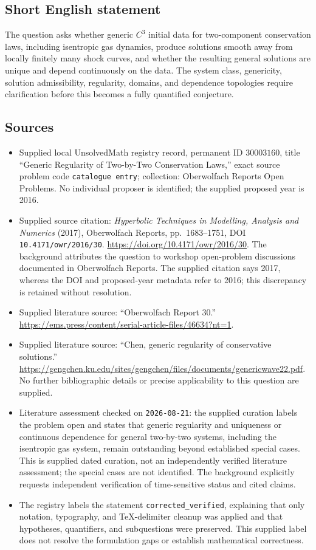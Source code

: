 \documentclass[11pt]{article}
\begin{document}
\subsection{Short English statement}
The question asks whether generic \(C^3\) initial data for two-component conservation laws, including isentropic gas dynamics, produce solutions smooth away from locally finitely many shock curves, and whether the resulting general solutions are unique and depend continuously on the data. The system class, genericity, solution admissibility, regularity, domains, and dependence topologies require clarification before this becomes a fully quantified conjecture.
\subsection{Sources}
\begin{itemize}
\item Supplied local UnsolvedMath registry record, permanent ID \(30003160\), title ``Generic Regularity of Two-by-Two Conservation Laws,'' exact source problem code \texttt{catalogue entry}; collection: Oberwolfach Reports Open Problems. No individual proposer is identified; the supplied proposed year is 2016.
\item Supplied source citation: \emph{Hyperbolic Techniques in Modelling, Analysis and Numerics} (2017), Oberwolfach Reports, pp.\ 1683--1751, DOI \texttt{10.4171/owr/2016/30}. \url{https://doi.org/10.4171/owr/2016/30}. The background attributes the question to workshop open-problem discussions documented in Oberwolfach Reports. The supplied citation says 2017, whereas the DOI and proposed-year metadata refer to 2016; this discrepancy is retained without resolution.
\item Supplied literature source: ``Oberwolfach Report 30.'' \url{https://ems.press/content/serial-article-files/46634?nt=1}.
\item Supplied literature source: ``Chen, generic regularity of conservative solutions.'' \url{https://gengchen.ku.edu/sites/gengchen/files/documents/genericwave22.pdf}. No further bibliographic details or precise applicability to this question are supplied.
\item Literature assessment checked on \texttt{2026-08-21}: the supplied curation labels the problem open and states that generic regularity and uniqueness or continuous dependence for general two-by-two systems, including the isentropic gas system, remain outstanding beyond established special cases. This is supplied dated curation, not an independently verified literature assessment; the special cases are not identified. The background explicitly requests independent verification of time-sensitive status and cited claims.
\item The registry labels the statement \texttt{corrected\_verified}, explaining that only notation, typography, and TeX-delimiter cleanup was applied and that hypotheses, quantifiers, and subquestions were preserved. This supplied label does not resolve the formulation gaps or establish mathematical correctness.
\end{itemize}
\end{document}
